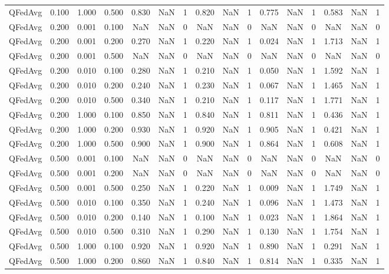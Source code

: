 \begin{table}[htbp]
\begin{tabular}{lccccccccccccccc}
QFedAvg & 0.100 & 1.000 & 0.500 & 0.830 & NaN & 1 & 0.820 & NaN & 1 & 0.775 & NaN & 1 & 0.583 & NaN & 1 \\
QFedAvg & 0.200 & 0.001 & 0.100 & NaN & NaN & 0 & NaN & NaN & 0 & NaN & NaN & 0 & NaN & NaN & 0 \\
QFedAvg & 0.200 & 0.001 & 0.200 & 0.270 & NaN & 1 & 0.220 & NaN & 1 & 0.024 & NaN & 1 & 1.713 & NaN & 1 \\
QFedAvg & 0.200 & 0.001 & 0.500 & NaN & NaN & 0 & NaN & NaN & 0 & NaN & NaN & 0 & NaN & NaN & 0 \\
QFedAvg & 0.200 & 0.010 & 0.100 & 0.280 & NaN & 1 & 0.210 & NaN & 1 & 0.050 & NaN & 1 & 1.592 & NaN & 1 \\
QFedAvg & 0.200 & 0.010 & 0.200 & 0.240 & NaN & 1 & 0.230 & NaN & 1 & 0.067 & NaN & 1 & 1.465 & NaN & 1 \\
QFedAvg & 0.200 & 0.010 & 0.500 & 0.340 & NaN & 1 & 0.210 & NaN & 1 & 0.117 & NaN & 1 & 1.771 & NaN & 1 \\
QFedAvg & 0.200 & 1.000 & 0.100 & 0.850 & NaN & 1 & 0.840 & NaN & 1 & 0.811 & NaN & 1 & 0.436 & NaN & 1 \\
QFedAvg & 0.200 & 1.000 & 0.200 & 0.930 & NaN & 1 & 0.920 & NaN & 1 & 0.905 & NaN & 1 & 0.421 & NaN & 1 \\
QFedAvg & 0.200 & 1.000 & 0.500 & 0.900 & NaN & 1 & 0.900 & NaN & 1 & 0.864 & NaN & 1 & 0.608 & NaN & 1 \\
QFedAvg & 0.500 & 0.001 & 0.100 & NaN & NaN & 0 & NaN & NaN & 0 & NaN & NaN & 0 & NaN & NaN & 0 \\
QFedAvg & 0.500 & 0.001 & 0.200 & NaN & NaN & 0 & NaN & NaN & 0 & NaN & NaN & 0 & NaN & NaN & 0 \\
QFedAvg & 0.500 & 0.001 & 0.500 & 0.250 & NaN & 1 & 0.220 & NaN & 1 & 0.009 & NaN & 1 & 1.749 & NaN & 1 \\
QFedAvg & 0.500 & 0.010 & 0.100 & 0.350 & NaN & 1 & 0.240 & NaN & 1 & 0.096 & NaN & 1 & 1.473 & NaN & 1 \\
QFedAvg & 0.500 & 0.010 & 0.200 & 0.140 & NaN & 1 & 0.100 & NaN & 1 & 0.023 & NaN & 1 & 1.864 & NaN & 1 \\
QFedAvg & 0.500 & 0.010 & 0.500 & 0.310 & NaN & 1 & 0.290 & NaN & 1 & 0.130 & NaN & 1 & 1.754 & NaN & 1 \\
QFedAvg & 0.500 & 1.000 & 0.100 & 0.920 & NaN & 1 & 0.920 & NaN & 1 & 0.890 & NaN & 1 & 0.291 & NaN & 1 \\
QFedAvg & 0.500 & 1.000 & 0.200 & 0.860 & NaN & 1 & 0.840 & NaN & 1 & 0.814 & NaN & 1 & 0.335 & NaN & 1 \\

\end{tabular}
\end{table}
